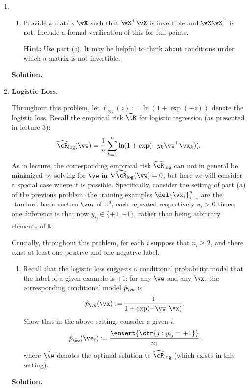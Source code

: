 \documentclass{article}
\newcommand\T{{\scriptscriptstyle\mathsf{T}}}
\def\R{\mathbb{R}}
\def\hcR{\widehat{\cR}}
\def\hcRlog{\hcR_{\log}}
\def\llog{\ell_{\log}}
\newcommand{\pww}[1]{\hat p_{#1}}
\theoremstyle{definition}
\theoremstyle{remark}
\newenvironment{Q}
{%
  \clearpage
  \item
  }
  {%
    \phantom{s} %
    \bigskip
    \textbf{Solution.}
  }
\begin{document}
\begin{enumerate}[font={\Large\bfseries},left=0pt]
\begin{Q}
\begin{enumerate}
    \textbf{Remark:} This characterizes when linear regression has a unique solution due to the normal equation (note that we always have at least one solution obtained by the pseudoinverse). We would not have had a unique solution for part (a) if we had an $n_i = 0$.
    
    \item Provide a matrix $\vX$ such that $\vX^\top \vX$ is invertible and $\vX\vX^\top$ is not. Include a formal verification of this for full points.
    
    \textbf{Hint:} Use part (c). It may be helpful to think about conditions under which a matrix is not invertible.
    
    
  \end{enumerate}
  \end{Q}


    \begin{Q}
        \textbf{\Large Logistic Loss.}

Throughout this problem, let $\llog(z) := \ln(1+\exp(-z))$ denote the logistic loss.
Recall the empirical risk $\hcR$ for logistic regression (as presented in lecture 3):
  \begin{align*}
  \hcR_{\log}(\vw) = \frac{1}{n} \sum_{k=1}^n \ln ( 1 + \exp( - y_k \vw^\top \vx_k ) ).
  \end{align*}
As in lecture, the corresponding empirical risk $\hcRlog$ can not in general be minimized
by solving for $\vw$ in $\nabla \hcRlog(\vw) = 0$, but here we will consider
a special case where it is possible.
Specifically, consider the setting of part (a) of the previous problem:
the training examples $\del{\vx_i}_{i = 1}^n$ are the standard basis vectors $\ve_i$ of $\R^d$,
each repeated respectively $n_i > 0$ times;
one difference is that now $y_{i_j} \in \{+1,-1\}$, rather than being arbitrary elements 
of $\R$.

Crucially, throughout this problem, for each $i$ suppose that $n_i\geq 2$, and there
exist at least one positive and one negative label.

\begin{enumerate}
\item
  Recall that the logistic loss suggests a conditional probability model that the
  label of a given example is $+1$:
  for any $\vw$ and any $\vx$, the corresponding conditional model $\pww{\vw}$ is
  \[
    \pww{\vw}(\vx) := \frac {1}{1 + \exp(-\vw^\T \vx)}.
  \]
  Show that in the above setting, consider a given $i$,
  \[
    \pww{\hat \vw}(\ve_i) := \frac {\envert{\cbr{ j : y_{i_j} = +1}}}{n_i},
  \]
  where $\hat \vw$ denotes the optimal solution to $\hcRlog$ (which exists in this setting).
  

\end{enumerate}
\end{Q}
\end{enumerate}
\end{document}
